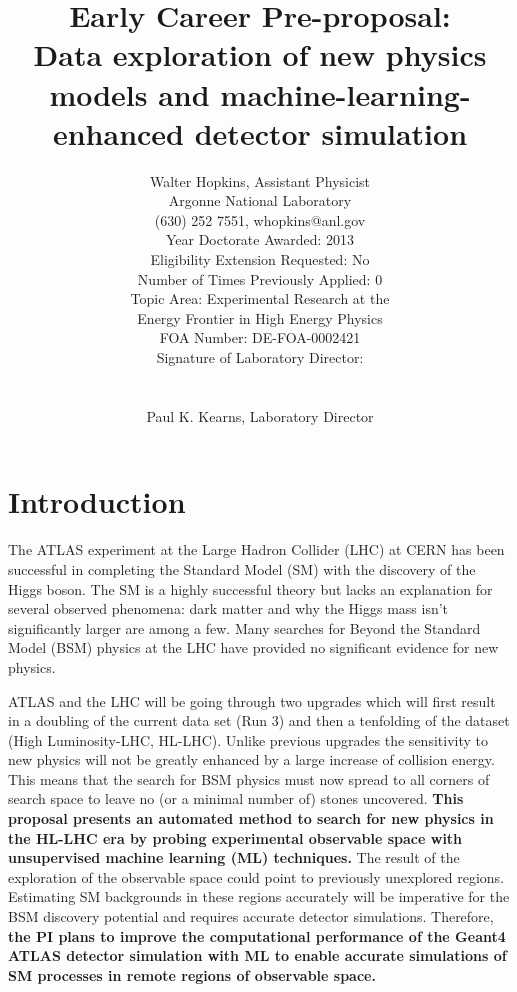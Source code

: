 \documentclass[letter, USenglish, 11pt]{article}
\title{Early Career Pre-proposal: \\Data exploration of new physics models and machine-learning-enhanced detector simulation}
\author{Walter Hopkins, Assistant Physicist\\Argonne National Laboratory\\(630) 252 7551, whopkins@anl.gov\\Year Doctorate Awarded: 2013\\Eligibility Extension Requested: No\\Number of Times Previously Applied: 0\\ Topic Area: Experimental Research at the \\Energy Frontier in High Energy Physics\\
  FOA Number: DE-FOA-0002421\\Signature of Laboratory Director: \\ \\ \\Paul K. Kearns, Laboratory Director
}
\date{}
\begin{document}
\maketitle


\section*{Introduction}
The ATLAS experiment at the Large Hadron Collider (LHC) at CERN has been successful in completing the Standard Model (SM) with the discovery of the Higgs boson. The SM is a highly successful theory but lacks an explanation for several observed phenomena: dark matter and why the Higgs mass isn’t significantly larger are among a few. Many searches for Beyond the Standard Model (BSM) physics at the LHC have provided no significant evidence for new physics. 

ATLAS and the LHC will be going through two upgrades which will first result in a doubling of the current data set (Run 3) and then a tenfolding of the dataset (High Luminosity-LHC, HL-LHC). Unlike previous upgrades the sensitivity to new physics will not be greatly enhanced by a large increase of collision energy. This means that the search for BSM physics must now spread to all corners of search space to leave no (or a minimal number of) stones uncovered. {\bf This proposal presents an automated method to search for new physics in the HL-LHC era by probing experimental observable space with unsupervised machine learning (ML) techniques.} The result of the exploration of the observable space could point to previously unexplored regions. Estimating SM backgrounds in these regions accurately will be imperative for the BSM discovery potential and requires accurate detector simulations. Therefore, {\bf the PI plans to improve the computational performance of the Geant4 ATLAS detector simulation with ML to enable accurate simulations of SM processes in remote regions of observable space.}

\clearpage
\end{document}
